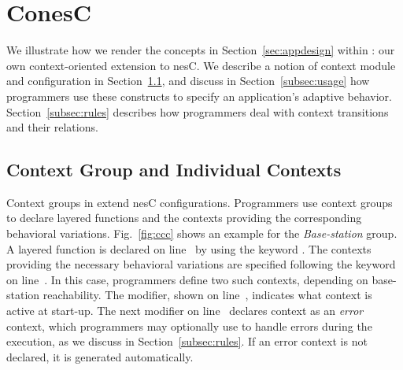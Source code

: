 
\section{ConesC}\label{sec:conesc}


We illustrate how we render the concepts in
Section~\ref{sec:appdesign} within \conesc: our own context-oriented
extension to nesC.  We describe a notion of context module and
configuration in Section~\ref{subsec:components}, and discuss in
Section~\ref{subsec:usage} how programmers use these constructs to
specify an application's adaptive behavior.
Section~\ref{subsec:rules} describes how \conesc programmers deal with
context transitions and their relations.

\subsection{Context Group and Individual Contexts}\label{subsec:components}


Context groups in \conesc extend nesC configurations. Programmers use
context groups to declare layered functions and the contexts providing
the corresponding behavioral variations. Fig.~\ref{fig:ccc} shows an
example for the \emph{Base-station} group. A layered 
function is declared on line~ by using the keyword
. The contexts providing the necessary behavioral
variations are specified following the keyword  on
line~. In this case, programmers define two such
contexts, depending on base-station reachability. The  modifier, shown on line~, indicates what
context is active at start-up. The next  modifier on
line~ declares context  as an
\emph{error} context, which programmers may optionally use to handle
errors during the execution, as we discuss in
Section~\ref{subsec:rules}. If an error context is not declared, it is
generated automatically.

